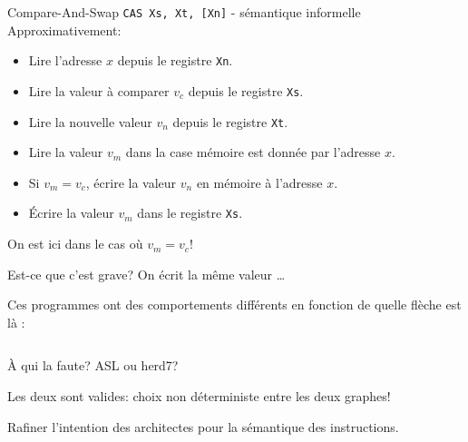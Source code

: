 \documentclass[10pt, dvipsnames]{beamer}
\begin{document}
\begin{frame}{Compare-And-Swap \texttt{CAS Xs, Xt, [Xn]} - s\'emantique informelle}
  Approximativement:
  \begin{itemize}%
      \color{gray}
    \item Lire l'adresse $x$ depuis le registre \texttt{Xn}.
    \item Lire la valeur \`a comparer $v_c$ depuis le registre \texttt{Xs}.
    \item Lire la nouvelle valeur $v_n$ depuis le registre \texttt{Xt}.
    \item Lire la valeur $v_m$ dans la case m\'emoire est donn\'ee par l'adresse $x$.
      \color{black}
    \item Si $v_m = v_c$, \'ecrire la valeur $v_n$ en m\'emoire \`a l'adresse $x$.
    \item \'Ecrire la valeur $v_m$ dans le registre \texttt{Xs}.
  \end{itemize}
  \vfill
  On est ici dans le cas o\`u $v_m = v_c$!
\end{frame}

\begin{frame}[fragile]{Est-ce que c'est grave?}
  On \'ecrit la m\^eme valeur \dots

  \pause
  \vfill
  Ces programmes ont des comportements diff\'erents en fonction de quelle fl\`eche est l\`a :

  \begin{columns}[T]
    \hfill
    \begin{column}{.4\textwidth}
      
    \end{column}
    \hfill
    \begin{column}{.4\textwidth}
      
    \end{column}
    \hfill
  \end{columns}
\end{frame}

\begin{frame}{\`A qui la faute?}
  ASL ou herd7?

  \pause
  \vspace{1em}
  Les deux sont valides: choix non d\'eterministe entre les deux graphes!

  \vspace{1em}
  Rafiner l'intention des architectes pour la s\'emantique des instructions.
\end{frame}
\end{document}
